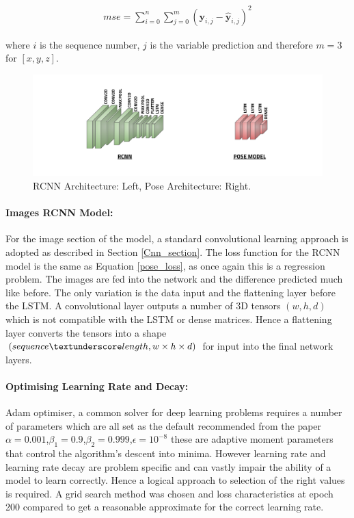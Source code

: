 \documentclass[11pt,twoside]{report}
\begin{document}
\begin{equation}
\begin{aligned}
mse = 
\sum_{i=0}^{n}\sum_{j=0}^{m} (\mathbf{y}_{i,j}-\hat{\mathbf{y}}_{i,j})^{2}
\end{aligned}
\label{pose_loss}
\end{equation}

where $i$ is the sequence number, $j$ is the variable prediction and therefore $m=3$ for $[x,y,z]$.

\noindent \begin{figure}[h!]
	\includegraphics[width = 1.0\hsize]{figures/Networks.png}
	\caption{RCNN Architecture: Left, Pose Architecture: Right.}
	\label{network_architecture}
\end{figure}

\paragraph{Images RCNN Model:} \label{images_rcnn}
For the image section of the model, a standard convolutional learning approach is adopted as described in Section \ref{Cnn_section}. The loss function for the RCNN model is the same as Equation \ref{pose_loss}, as once again this is a regression problem. The images are fed into the network and the difference predicted much like before. The only variation is the data input and the flattening layer before the LSTM. A convolutional layer outputs a number of 3D tensors $(w,h,d)$ which is not compatible with the LSTM or dense matrices. Hence a flattening layer converts the tensors into a shape $(sequence \textunderscore length, w \times h \times d)$ for input into the final network layers.

\paragraph{Optimising Learning Rate and Decay:}

Adam optimiser, a common solver for deep learning problems requires a number of parameters which are all set as the default recommended from the paper \cite{DBLP:journals/corr/KingmaB14} $\alpha=0.001$,$\beta_{1}=0.9$,$\beta_{2}=0.999$,$\epsilon=10^{-8}$ these are adaptive moment parameters that control the algorithm's descent into minima. However learning rate and learning rate decay are problem specific and can vastly impair the ability of a model to learn correctly. Hence a logical approach to selection of the right values is required. A grid search method was chosen and loss characteristics at epoch 200 compared to get a reasonable approximate for the correct learning rate.
\end{document}
